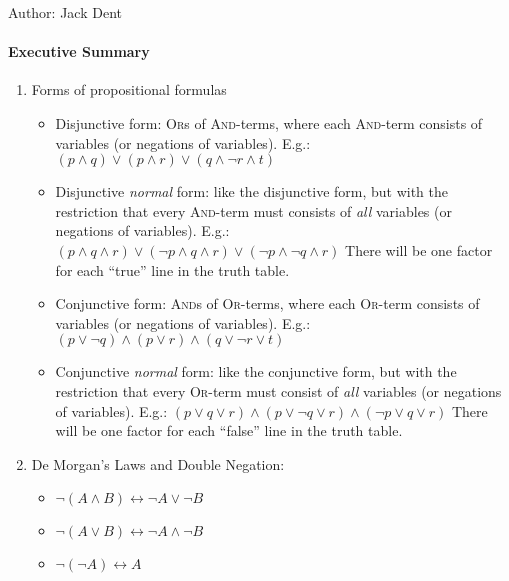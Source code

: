 \documentclass[solution, letterpaper]{cs20inclass}
\begin{document}

\noindent Author: Jack Dent%

\paragraph*{Executive Summary}
\begin{enumerate}

\item Forms of propositional formulas

\begin{itemize}
  \item  Disjunctive form: \textsc{Or}s of \textsc{And}-terms, where each \textsc{And}-term consists of variables (or negations of variables). E.g.: $(p \land q) \lor (p \land r) \lor (q \land \lnot r \land t) $

  \item Disjunctive \emph{normal} form: like the disjunctive form, but with the restriction that every \textsc{And}-term must consists of \emph{all} variables (or negations of variables). E.g.: $(p \land q \land  r) \lor (\lnot p \land q \land r)\lor (\lnot p \land \lnot q \land r) $ There will be one factor for each ``true'' line in the truth table.

  \item Conjunctive form: \textsc{And}s of \textsc{Or}-terms, where each \textsc{Or}-term consists of variables (or negations of variables). E.g.: $(p \lor \lnot q) \land (p \lor r) \land (q \lor \lnot r \lor t)$
  \item Conjunctive \emph {normal} form: like the conjunctive form, but with the restriction that every \textsc{Or}-term must consist of \emph{all} variables (or negations of variables). E.g.: $(p \lor q \lor r) \land (p \lor \lnot q \lor r) \land (\lnot p \lor q \lor r)$ There will be one factor for each ``false'' line in the truth table.

\end{itemize}

\item De Morgan's Laws and Double Negation:
  \begin{itemize}
    \item $\lnot (A \land B) \longleftrightarrow \lnot A \lor \lnot B$
    \item $\lnot (A \lor B) \longleftrightarrow \lnot A \land \lnot B$
    \item $\lnot (\lnot A) \longleftrightarrow A$
  \end{itemize}


\end{enumerate}
\end{document}
